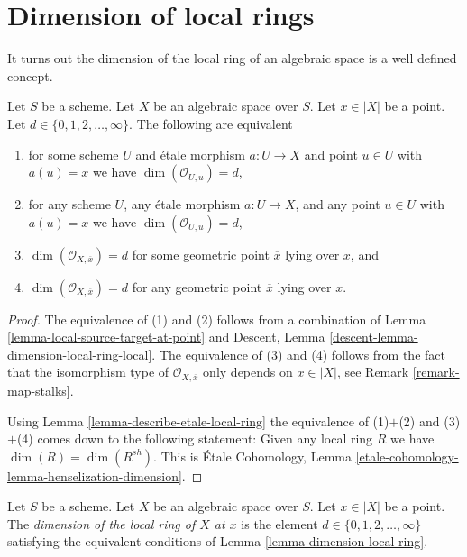 \section{Dimension of local rings}
\label{section-dimension-local-ring}

\noindent
It turns out the dimension of the local ring of an algebraic space is a
well defined concept.

\begin{lemma}
\label{lemma-dimension-local-ring}
Let $S$ be a scheme.
Let $X$ be an algebraic space over $S$.
Let $x \in |X|$ be a point.
Let $d \in \{0, 1, 2, \ldots, \infty\}$.
The following are equivalent
\begin{enumerate}
\item for some scheme $U$ and \'etale morphism $a : U \to X$ and point
$u \in U$ with $a(u) = x$ we have $\dim(\mathcal{O}_{U, u}) = d$,
\item for any scheme $U$, any \'etale morphism $a : U \to X$, and any point
$u \in U$ with $a(u) = x$ we have $\dim(\mathcal{O}_{U, u}) = d$,
\item $\dim(\mathcal{O}_{X, \overline{x}}) = d$ for some geometric
point $\overline{x}$ lying over $x$, and
\item $\dim(\mathcal{O}_{X, \overline{x}}) = d$ for any geometric
point $\overline{x}$ lying over $x$.
\end{enumerate}
\end{lemma}

\begin{proof}
The equivalence of (1) and (2) follows from a combination of
Lemma \ref{lemma-local-source-target-at-point} and
Descent, Lemma \ref{descent-lemma-dimension-local-ring-local}.
The equivalence of (3) and (4) follows from the fact that the
isomorphism type of $\mathcal{O}_{X, \overline{x}}$ only depends
on $x \in |X|$, see
Remark \ref{remark-map-stalks}.

\medskip\noindent
Using
Lemma \ref{lemma-describe-etale-local-ring}
the equivalence of (1)$+$(2) and (3)$+$(4) comes down to the
following statement: Given any local ring $R$ we have
$\dim(R) = \dim(R^{sh})$. This is
\'Etale Cohomology, Lemma \ref{etale-cohomology-lemma-henselization-dimension}.
\end{proof}

\begin{definition}
\label{definition-dimension-local-ring}
Let $S$ be a scheme. Let $X$ be an algebraic space over $S$.
Let $x \in |X|$ be a point.
The {\it dimension of the local ring of $X$ at $x$} is
the element $d \in \{0, 1, 2, \ldots, \infty\}$
satisfying the equivalent conditions of
Lemma \ref{lemma-dimension-local-ring}.
\end{definition}








